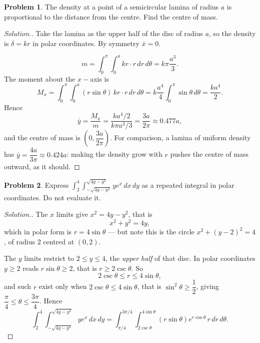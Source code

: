 \documentclass[11pt,a4paper]{article}
\theoremstyle{definition}
\newtheorem{problemx}{Problem}[subsection]
\newenvironment{problem}{\begin{problemx}}{\end{problemx}}
\newenvironment{solution}
  {\renewcommand{\qedsymbol}{}\begin{proof}[\textit{Solution}.]}
  {\end{proof}}
\begin{document}
\begin{problem}
The density at a point of a semicircular lamina of radius $a$ is proportional to
the distance from the centre. Find the centre of mass.
\end{problem}
\begin{solution}
Take the lamina as the upper half of the disc of radius $a$, so the density is
$\delta = kr$ in polar coordinates. By symmetry $\bar x = 0$.

\[m = \int_0^{\pi}\int_0^a kr\cdot r\,dr\,d\theta
= k\pi\frac{a^3}{3}.\]
The moment about the $x-$axis is
\[M_x = \int_0^{\pi}\int_0^a (r\sin\theta)\,kr\cdot r\,dr\,d\theta
= k\frac{a^4}{4}\int_0^{\pi}\sin\theta\,d\theta = \frac{ka^4}{2}.\]
Hence
\[\bar y = \frac{M_x}{m} = \frac{ka^4/2}{k\pi a^3/3} = \frac{3a}{2\pi}
\approx 0.477a ,\]
and the centre of mass is $\left(0, \dfrac{3a}{2\pi}\right)$. For comparison, a
lamina of uniform density has $\bar y = \dfrac{4a}{3\pi}\approx 0.424a$: making
the density grow with $r$ pushes the centre of mass outward, as it should.
\end{solution}

\begin{problem}
Express
$\displaystyle{\int_2^4\int_{-\sqrt{4y-y^2}}^{\sqrt{4y-y^2}}ye^x\,dx\,dy}$
as a repeated integral in polar coordinates. Do not evaluate it.
\end{problem}
\begin{solution}
The $x$ limits give $x^2 = 4y-y^2$, that is
\[x^2+y^2 = 4y ,\]
which in polar form is $r = 4\sin\theta$ --- but note this is the circle
$x^2+(y-2)^2 = 4$, of radius $2$ centred at $(0,2)$.

The $y$ limits restrict to $2\leq y\leq 4$, the \emph{upper half} of that disc.
In polar coordinates $y\geq 2$ reads $r\sin\theta\geq 2$, that is
$r\geq 2\csc\theta$. So
\[2\csc\theta \leq r \leq 4\sin\theta ,\]
and such $r$ exist only when $2\csc\theta\leq 4\sin\theta$, that is
$\sin^2\theta\geq\dfrac12$, giving
$\dfrac{\pi}{4}\leq\theta\leq\dfrac{3\pi}{4}$. Hence
\[\int_2^4\int_{-\sqrt{4y-y^2}}^{\sqrt{4y-y^2}}ye^x\,dx\,dy
= \int_{\pi/4}^{3\pi/4}\int_{2\csc\theta}^{4\sin\theta}
(r\sin\theta)e^{r\cos\theta}\,r\,dr\,d\theta .\]
\end{solution}
\end{document}
